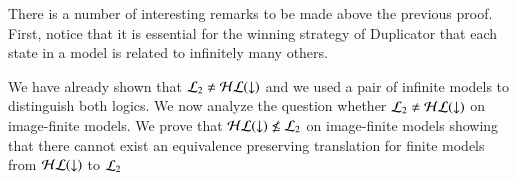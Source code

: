 There is a number of interesting remarks to be made above the
previous proof. First, notice that it is essential for the winning
strategy of Duplicator that each state in a model is related to
infinitely many others.


We have already shown that $\mathcal{L}_2 \not= \mathcal{HL}({\downarrow})$ and we used a
pair of infinite models to distinguish both logics. We now analyze
the question whether $\mathcal{L}_2 \not= \mathcal{HL}({\downarrow})$ on image-finite models.
We prove that $\mathcal{HL}({\downarrow}) \not \leq \mathcal{L}_2$ on image-finite models
showing that there cannot exist an equivalence preserving
translation for finite models from $\mathcal{HL}({\downarrow})$ to $\mathcal{L}_2$




